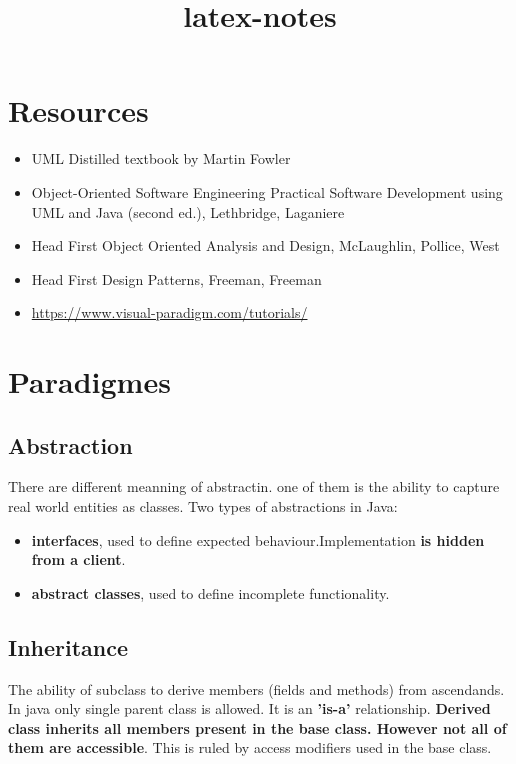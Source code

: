 \documentclass{report}
\title{latex-notes}
\begin{document}
\tableofcontents





\part{Resources}

\begin{itemize}
	\item UML Distilled textbook by Martin Fowler 
	\item Object-Oriented Software Engineering Practical Software Development
	using UML and Java (second ed.), Lethbridge, Laganiere
	\item Head First Object Oriented Analysis and Design, McLaughlin, Pollice, West
	\item Head First Design Patterns, Freeman, Freeman 
	\item \url{https://www.visual-paradigm.com/tutorials/}
\end{itemize}




\part{Paradigmes}



\chapter{Abstraction}
There are different meanning of abstractin. one of them is the ability to capture real world entities as classes.
Two types of abstractions in Java:
\begin{itemize}
	\item \textbf{interfaces}, used to define expected behaviour.Implementation \textbf{is hidden from a client}.
	\item \textbf{abstract classes}, used to define incomplete functionality.
\end{itemize}



\chapter{Inheritance}
The ability of subclass to derive members (fields and methods) from ascendands. In java only single parent class is allowed. It is an \textbf{'is-a'} relationship.
\textbf{Derived class inherits all members present in the base class. 
However not all of them are accessible}. This is ruled by access modifiers used in the base class.
\end{document}
